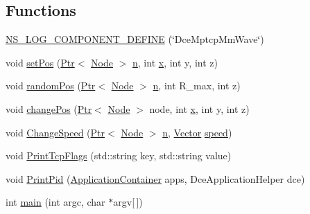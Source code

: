 \subsection*{Functions}
\begin{DoxyCompactItemize}
\item 
\hyperlink{dce-example-mptcp-mmwave_8cc_a3fa7cf145568dd58c7a9355dc59a6f45}{N\+S\+\_\+\+L\+O\+G\+\_\+\+C\+O\+M\+P\+O\+N\+E\+N\+T\+\_\+\+D\+E\+F\+I\+NE} (\char`\"{}Dce\+Mptcp\+Mm\+Wave\char`\"{})
\item 
void \hyperlink{dce-example-mptcp-mmwave_8cc_af9909077be6393b8cc46f5ac55a77f84}{set\+Pos} (\hyperlink{classns3_1_1Ptr}{Ptr}$<$ \hyperlink{classns3_1_1Node}{Node} $>$ \hyperlink{lte__link__budget__x2__handover__measures_8m_abdb05bc5a064cf642a06c83b3392f148}{n}, int \hyperlink{lte__link__budget__x2__handover__measures_8m_a9336ebf25087d91c818ee6e9ec29f8c1}{x}, int y, int z)
\item 
void \hyperlink{dce-example-mptcp-mmwave_8cc_a413c7e5fc698544007360bfb970ca4e2}{random\+Pos} (\hyperlink{classns3_1_1Ptr}{Ptr}$<$ \hyperlink{classns3_1_1Node}{Node} $>$ \hyperlink{lte__link__budget__x2__handover__measures_8m_abdb05bc5a064cf642a06c83b3392f148}{n}, int R\+\_\+max, int z)
\item 
void \hyperlink{dce-example-mptcp-mmwave_8cc_a9b9dff7c3f777f5fd2b82d4f54ea253b}{change\+Pos} (\hyperlink{classns3_1_1Ptr}{Ptr}$<$ \hyperlink{classns3_1_1Node}{Node} $>$ node, int \hyperlink{lte__link__budget__x2__handover__measures_8m_a9336ebf25087d91c818ee6e9ec29f8c1}{x}, int y, int z)
\item 
void \hyperlink{dce-example-mptcp-mmwave_8cc_a1fe18c61b129ac2c333ca0c841e280ee}{Change\+Speed} (\hyperlink{classns3_1_1Ptr}{Ptr}$<$ \hyperlink{classns3_1_1Node}{Node} $>$ \hyperlink{lte__link__budget__x2__handover__measures_8m_abdb05bc5a064cf642a06c83b3392f148}{n}, \hyperlink{classns3_1_1Vector3D_a7e59b47bc94c9cb1dadff68c1d0112d8}{Vector} \hyperlink{mmwave-amc-test_8cc_a6dc6e6f3c75c509ce943163afb5dade7}{speed})
\item 
void \hyperlink{dce-example-mptcp-mmwave_8cc_ac9fec08dbddf65e23e12904957937ada}{Print\+Tcp\+Flags} (std\+::string key, std\+::string value)
\item 
void \hyperlink{dce-example-mptcp-mmwave_8cc_a3d80f42085f397335e0bb9e3fc25f6a5}{Print\+Pid} (\hyperlink{classns3_1_1ApplicationContainer}{Application\+Container} apps, Dce\+Application\+Helper dce)
\item 
int \hyperlink{dce-example-mptcp-mmwave_8cc_a0ddf1224851353fc92bfbff6f499fa97}{main} (int argc, char $\ast$argv\mbox{[}$\,$\mbox{]})
\end{DoxyCompactItemize}
